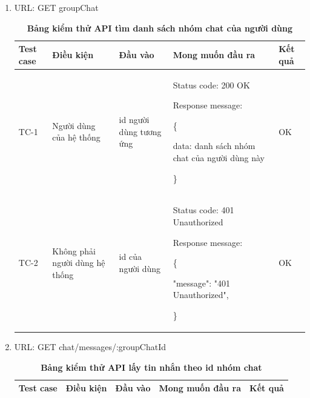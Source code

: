 \begin{enumerate}
  \item URL: GET groupChat
    \begin{xltabular}{\textwidth}{
    | >{\raggedright\arraybackslash}p{1cm}
    | >{\raggedright\arraybackslash}p{2.5cm}
    | >{\raggedright\arraybackslash}X
    | >{\raggedright\arraybackslash}X
    | >{\raggedright\arraybackslash}p{1cm}|
    }
    \caption{\bfseries \fontsize{12pt}{0pt}\selectfont Bảng kiểm thử API tìm danh sách nhóm chat của người dùng}
    \\
    \hline
    \bfseries Test case    &\bfseries Điều kiện   &\bfseries Đầu vào 
    &\bfseries Mong muốn đầu ra &\bfseries Kết quả\\ \hline
  
  
    TC-1
    & Người dùng của hệ thống
    & id người dùng tương ứng
    & 
  
    Status code: 200 OK
  
      Response message:
  
      \{

        data: danh sách nhóm chat của người dùng này
  
      \}
    
    & OK
  
    \\ \hline

    TC-2
    & Không phải người dùng hệ thống
    & id của người dùng
    & 
  
    Status code: 401 Unauthorized
  
      Response message:
  
      \{

    "message": "401 Unauthorized",

    \}
    
    & OK
  
    \\ \hline
  
    \end{xltabular}

  \item URL: GET chat/messages/:groupChatId
    \begin{xltabular}{\textwidth}{
    | >{\raggedright\arraybackslash}p{1cm}
    | >{\raggedright\arraybackslash}p{2.5cm}
    | >{\raggedright\arraybackslash}X
    | >{\raggedright\arraybackslash}X
    | >{\raggedright\arraybackslash}p{1cm}|
    }
    \caption{\bfseries \fontsize{12pt}{0pt}\selectfont Bảng kiểm thử API lấy tin nhắn theo id nhóm chat}
    \\
    \hline
    \bfseries Test case    &\bfseries Điều kiện   &\bfseries Đầu vào 
    &\bfseries Mong muốn đầu ra &\bfseries Kết quả\\ \hline
  

\end{xltabular}
\end{enumerate}
